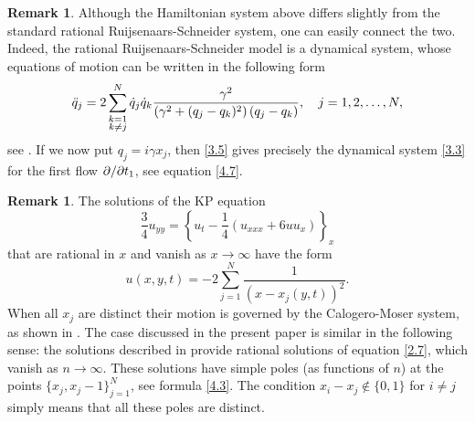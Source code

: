 \documentclass[11pt,reqno]{amsart}
\theoremstyle{definition}
\newtheorem{Remark}[Theorem]{Remark}
\numberwithin{equation}{section}
\begin{document}
\begin{Remark}\label{re3.2} Although the Hamiltonian system above differs 
slightly from the standard rational Ruijsenaars-Schneider system, one can 
easily connect the two. Indeed, the rational Ruijsenaars-Schneider model is 
a dynamical system, whose equations of motion can be written in 
the following form
\begin{equation}\label{3.5}
\ddot{q}_j=2\sum_{\begin{subarray}{c}k=1 \\k\neq j\end{subarray}}^N
\dot{q}_j\dot{q}_k\frac{\gamma^2}{\left(\gamma^2+(q_j-q_k)^2\right)(q_j-q_k)},
\quad j=1,2,\dots,N,
\end{equation}
see \cite[formulas (B22)-(B23), p.~402]{RS}. If we now put 
$q_j=i\gamma x_j$, then \eqref{3.5} gives precisely the dynamical 
system \eqref{3.3} for the first flow $\partial/\partial t_1$, see equation \eqref{4.7}.
\end{Remark}

\begin{Remark} \label{re3.3} The solutions of the KP equation 
$$\frac{3}{4}u_{yy}=\left\{u_t-\frac{1}{4}(u_{xxx}+6uu_x)\right\}_x$$
that are rational in $x$ and vanish as $x\rightarrow\infty$ have the form 
$$u(x,y,t)=-2\sum_{j=1}^N\frac{1}{(x-x_j(y,t))^2}.$$
When all $x_j$ are distinct their motion is governed by the Calogero-Moser 
system, as shown in \cite{K}. The case discussed in the present paper is 
similar in the following sense: the solutions described in  
provide rational solutions of equation \eqref{2.7}, which vanish as 
$n\rightarrow\infty$. These solutions have simple poles (as functions of $n$)
at the points $\{x_j,x_j-1\}_{j=1}^N$, see formula \eqref{4.3}. The condition 
$x_i-x_j\notin\{0,1\}$ for $i\neq j$ simply means that all these poles are 
distinct.
\end{Remark}
\end{document}

